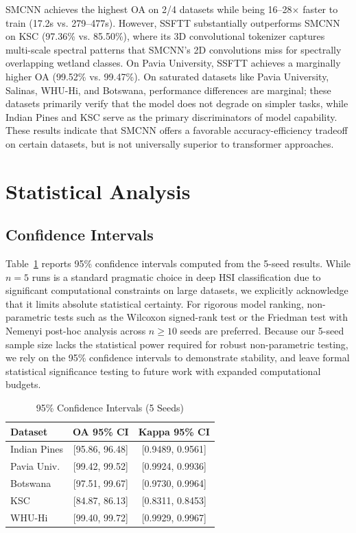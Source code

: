 \documentclass[pdflatex,sn-mathphys-num]{sn-jnl}
\theoremstyle{thmstyleone}
\theoremstyle{thmstyletwo}
\theoremstyle{thmstylethree}
\begin{document}
SMCNN achieves the highest OA on 2/4 datasets while being 16--28$\times$ faster to train (17.2s vs. 279--477s). However, SSFTT substantially outperforms SMCNN on KSC (97.36\% vs. 85.50\%), where its 3D convolutional tokenizer captures multi-scale spectral patterns that SMCNN's 2D convolutions miss for spectrally overlapping wetland classes. On Pavia University, SSFTT achieves a marginally higher OA (99.52\% vs. 99.47\%). On saturated datasets like Pavia University, Salinas, WHU-Hi, and Botswana, performance differences are marginal; these datasets primarily verify that the model does not degrade on simpler tasks, while Indian Pines and KSC serve as the primary discriminators of model capability. These results indicate that SMCNN offers a favorable accuracy-efficiency tradeoff on certain datasets, but is not universally superior to transformer approaches.

\section{Statistical Analysis}
\label{sec:stats}

\subsection{Confidence Intervals}

Table~\ref{tab:ci} reports 95\% confidence intervals computed from the 5-seed results. While $n=5$ runs is a standard pragmatic choice in deep HSI classification due to significant computational constraints on large datasets, we explicitly acknowledge that it limits absolute statistical certainty. For rigorous model ranking, non-parametric tests such as the Wilcoxon signed-rank test or the Friedman test with Nemenyi post-hoc analysis across $n \geq 10$ seeds are preferred. Because our 5-seed sample size lacks the statistical power required for robust non-parametric testing, we rely on the 95\% confidence intervals to demonstrate stability, and leave formal statistical significance testing to future work with expanded computational budgets.

\begin{table}[!t]
\caption{95\% Confidence Intervals (5 Seeds)}
\label{tab:ci}
\centering

\begin{tabular}{lcc}
\toprule
\textbf{Dataset} & \textbf{OA 95\% CI} & \textbf{Kappa 95\% CI} \\
\midrule
Indian Pines & [95.86, 96.48] & [0.9489, 0.9561] \\
Pavia Univ. & [99.42, 99.52] & [0.9924, 0.9936] \\
Botswana & [97.51, 99.67] & [0.9730, 0.9964] \\
KSC & [84.87, 86.13] & [0.8311, 0.8453] \\
WHU-Hi & [99.40, 99.72] & [0.9929, 0.9967] \\
\bottomrule
\end{tabular}
\end{table}
\end{document}
